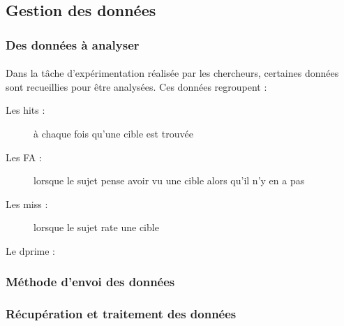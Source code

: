 \subsection{Gestion des données}
\label{Donnees}

\subsubsection{Des données à analyser}

\paragraph{}Dans la tâche d'expérimentation réalisée par les chercheurs, certaines données sont recueillies pour être analysées. Ces données regroupent :
\begin{description}
\item[Les hits :] à chaque fois qu'une cible est trouvée
\item[Les FA :] lorsque le sujet pense avoir vu une cible alors qu'il n'y en a pas
\item[Les miss :] lorsque le sujet rate une cible
\item[Le dprime :] 
\end{description}

\subsubsection{Méthode d'envoi des données}

\subsubsection{Récupération et traitement des données}